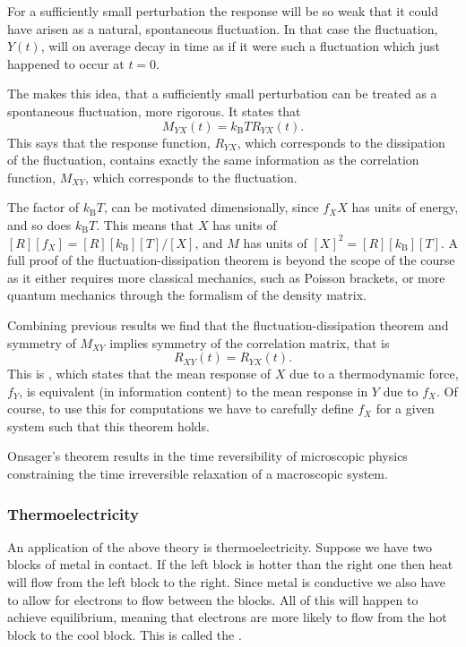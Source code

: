 \documentclass[fleqn]{NotesClass}
\newcommand*{\boltzmann}{k_{\mathrm{B}}}
\begin{document}
    For a sufficiently small perturbation the response will be so weak that it could have arisen as a natural, spontaneous fluctuation.
    In that case the fluctuation, \(Y(t)\), will on average decay in time as if it were such a fluctuation which just happened to occur at \(t = 0\).
    
    The  makes this idea, that a sufficiently small perturbation can be treated as a spontaneous fluctuation, more rigorous.
    It states that
    \begin{equation}
        M_{YX}(t) = \boltzmann TR_{YX}(t).
    \end{equation}
    This says that the response function, \(R_{YX}\), which corresponds to the dissipation of the fluctuation, contains exactly the same information as the correlation function, \(M_{XY}\), which corresponds to the fluctuation.
    
    The factor of \(\boltzmann T\), can be motivated dimensionally, since \(f_XX\) has units of energy, and so does \(\boltzmann T\).
    This means that \(X\) has units of \([R][f_X] = [R][\boltzmann][T]/[X]\), and \(M\) has units of \([X]^2 = [R][\boltzmann][T]\).
    A full proof of the fluctuation-dissipation theorem is beyond the scope of the course as it either requires more classical mechanics, such as Poisson brackets, or more quantum mechanics through the formalism of the density matrix.
    
    Combining previous results we find that the fluctuation-dissipation theorem and symmetry of \(M_{XY}\) implies symmetry of the correlation matrix, that is
    \begin{equation}
        R_{XY}(t) = R_{YX}(t).
    \end{equation}
    This is , which states that the mean response of \(X\) due to a thermodynamic force, \(f_Y\), is equivalent (in information content) to the mean response in \(Y\) due to \(f_X\).
    Of course, to use this for computations we have to carefully define \(f_X\) for a given system such that this theorem holds.
    
    Onsager's theorem results in the time reversibility of microscopic physics constraining the time irreversible relaxation of a macroscopic system.
    
    \subsubsection{Thermoelectricity}
    An application of the above theory is thermoelectricity.
    Suppose we have two blocks of metal in contact.
    If the left block is hotter than the right one then heat will flow from the left block to the right.
    Since metal is conductive we also have to allow for electrons to flow between the blocks.
    All of this will happen to achieve equilibrium, meaning that electrons are more likely to flow from the hot block to the cool block.
    This is called the .
    
\end{document}
